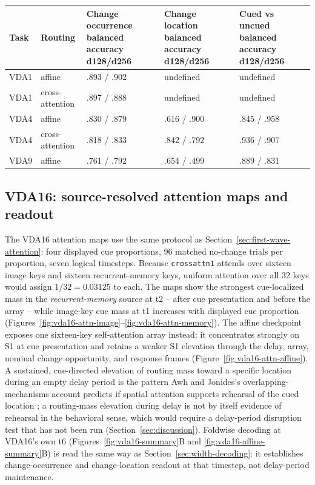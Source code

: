 \documentclass[11pt,a4paper]{article}
\newcommand{\env}[1]{\texttt{#1}}
\begin{document}
\begingroup\small
{}\label{tab:decoder-scores}
\begin{tabularx}{\textwidth}{@{}p{3.0cm}p{2.2cm}Y Y Y@{}}
\toprule
Task & Routing & Change occurrence balanced accuracy d128/d256 & Change location balanced accuracy d128/d256 & Cued vs uncued balanced accuracy d128/d256\\
\midrule
VDA1 & affine & .893 / .902 & undefined & undefined\\
VDA1 & cross-attention & .897 / .888 & undefined & undefined\\
VDA4 & affine & .830 / .879 & .616 / .900 & .845 / .958\\
VDA4 & cross-attention & .818 / .833 & .842 / .792 & .936 / .907\\
VDA9 & affine & .761 / .792 & .654 / .499 & .889 / .831\\
\bottomrule
\end{tabularx}
\endgroup

\subsection{VDA16: source-resolved attention maps and readout}\label{sec:vda16-attention-dynamics}
The VDA16 attention maps use the same protocol as Section~\ref{sec:first-wave-attention}: four displayed cue proportions, 96 matched no-change trials per proportion, seven logical timesteps. Because \env{crossattn1} attends over sixteen image keys and sixteen recurrent-memory keys, uniform attention over all 32 keys would assign $1/32=0.03125$ to each. The maps show the strongest cue-localized mass in the \emph{recurrent-memory} source at t2 -- after cue presentation and before the array -- while image-key cue mass at t1 increases with displayed cue proportion (Figures~\ref{fig:vda16-attn-image}--\ref{fig:vda16-attn-memory}). The affine checkpoint exposes one sixteen-key self-attention array instead: it concentrates strongly on S1 at cue presentation and retains a weaker S1 elevation through the delay, array, nominal change opportunity, and response frames (Figure~\ref{fig:vda16-attn-affine}). A sustained, cue-directed elevation of routing mass toward a specific location during an empty delay period is the pattern Awh and Jonides's overlapping-mechanisms account predicts if spatial attention supports rehearsal of the cued location \cite{awh2001}; a routing-mass elevation during delay is not by itself evidence of rehearsal in the behavioral sense, which would require a delay-period disruption test that has not been run (Section~\ref{sec:discussion}). Foldwise decoding at VDA16's own t6 (Figures~\ref{fig:vda16-summary}B and \ref{fig:vda16-affine-summary}B) is read the same way as Section~\ref{sec:width-decoding}: it establishes change-occurrence and change-location readout at that timestep, not delay-period maintenance.
\end{document}

